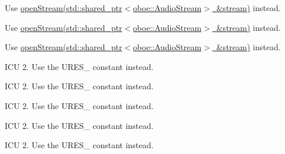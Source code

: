 \begin{DoxyRefList}
\label{deprecated__deprecated000245}%
%
Use \mbox{\hyperlink{classoboe_1_1_audio_stream_builder_a44b68216c48f8fb08a9e63178e0b0eeb}{open\+Stream(std\+::shared\+\_\+ptr$<$oboe\+::\+Audio\+Stream$>$ \&stream)}} instead. 

\label{deprecated__deprecated000253}%
%
Use \mbox{\hyperlink{classoboe_1_1_audio_stream_builder_a44b68216c48f8fb08a9e63178e0b0eeb}{open\+Stream(std\+::shared\+\_\+ptr$<$oboe\+::\+Audio\+Stream$>$ \&stream)}} instead. 

\label{deprecated__deprecated000255}%
%
Use \mbox{\hyperlink{classoboe_1_1_audio_stream_builder_a44b68216c48f8fb08a9e63178e0b0eeb}{open\+Stream(std\+::shared\+\_\+ptr$<$oboe\+::\+Audio\+Stream$>$ \&stream)}} instead.  
\item[Member \mbox{\hyperlink{ures_8h_a3f1197bf41a6228c38e3fddb58bf96fbae4f137b23dcc82d1b7c5b19d5453b3a1}{R\+E\+S\+\_\+\+A\+L\+I\+AS}} ]\label{deprecated__deprecated000077}%
%
I\+CU 2. Use the U\+R\+E\+S\+\_\+ constant instead.  
\item[Member \mbox{\hyperlink{ures_8h_a3f1197bf41a6228c38e3fddb58bf96fba2eeb630d6cacdd4cdeae5ae05edfc8bd}{R\+E\+S\+\_\+\+A\+R\+R\+AY}} ]\label{deprecated__deprecated000079}%
%
I\+CU 2. Use the U\+R\+E\+S\+\_\+ constant instead.  
\item[Member \mbox{\hyperlink{ures_8h_a3f1197bf41a6228c38e3fddb58bf96fba2ad74e7a8c734f374bf8b786617fb212}{R\+E\+S\+\_\+\+B\+I\+N\+A\+RY}} ]\label{deprecated__deprecated000075}%
%
I\+CU 2. Use the U\+R\+E\+S\+\_\+ constant instead.  
\item[Member \mbox{\hyperlink{ures_8h_a3f1197bf41a6228c38e3fddb58bf96fbaf1f3ced984a5ff062dae837b00769e9f}{R\+E\+S\+\_\+\+I\+NT}} ]\label{deprecated__deprecated000078}%
%
I\+CU 2. Use the U\+R\+E\+S\+\_\+ constant instead.  
\item[Member \mbox{\hyperlink{ures_8h_a3f1197bf41a6228c38e3fddb58bf96fbac5f51dba6417cd88750d7fb32c1cfb7e}{R\+E\+S\+\_\+\+I\+N\+T\+\_\+\+V\+E\+C\+T\+OR}} ]\label{deprecated__deprecated000080}%
%
I\+CU 2. Use the U\+R\+E\+S\+\_\+ constant instead.  
\item[Member \mbox{\hyperlink{ures_8h_a3f1197bf41a6228c38e3fddb58bf96fba78e3758a381e62148cc4b0438f3c0777}{R\+E\+S\+\_\+\+N\+O\+NE}} ]\label{deprecated__deprecated000073}%

\end{DoxyRefList}
